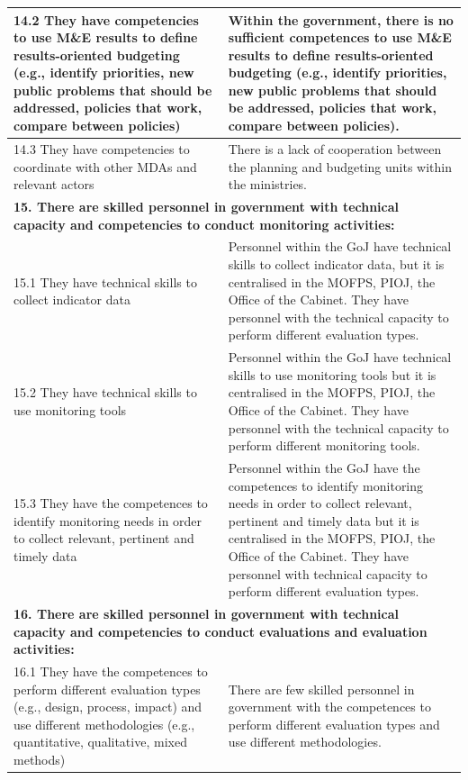 \documentclass[
  10pt,
]{book}
\begin{document}
\begin{table}
\begin{tabular}[t]{l|l}
\hline
\hspace{1em}14.2 They have competencies to use M\&E results to define results-oriented budgeting (e.g., identify priorities, new public problems that should be addressed, policies that work, compare between policies) & Within the government, there is no sufficient competences to use M\&E results to define results-oriented budgeting (e.g., identify priorities, new public problems that should be addressed, policies that work, compare between policies).\\
\hline
\hspace{1em}14.3 They have competencies to coordinate with other MDAs and relevant actors & There is a lack of cooperation between the planning and budgeting units within the ministries.\\
\hline
\multicolumn{2}{l}{\textbf{15. There are skilled personnel in government with technical capacity and competencies to conduct monitoring activities:}}\\
\hline
\hspace{1em}15.1 They have technical skills to collect indicator data & Personnel within the GoJ have technical skills to collect indicator data, but it is centralised in the MOFPS, PIOJ, the Office of the Cabinet. They have personnel with the technical capacity to perform different evaluation types.\\
\hline
\hspace{1em}15.2 They have technical skills to use monitoring tools & Personnel within the GoJ have technical skills to use monitoring tools but it is centralised in the MOFPS, PIOJ, the Office of the Cabinet. They have personnel with the technical capacity to perform different monitoring tools.\\
\hline
\hspace{1em}15.3 They have the competences to identify monitoring needs in order to collect relevant, pertinent and timely data & Personnel within the GoJ have the competences to identify monitoring needs in order to collect relevant, pertinent and timely data but it is centralised in the MOFPS, PIOJ, the Office of the Cabinet. They have personnel with technical capacity to perform different evaluation types.\\
\hline
\multicolumn{2}{l}{\textbf{16. There are skilled personnel in government with technical capacity and competencies to conduct evaluations and evaluation activities:}}\\
\hline
\hspace{1em}16.1 They have the competences to perform different evaluation types (e.g., design, process, impact) and use different methodologies (e.g., quantitative, qualitative, mixed methods) & There are few skilled personnel in government with the competences to perform different evaluation types and use different methodologies.\\

\end{tabular}
\end{table}
\end{document}
